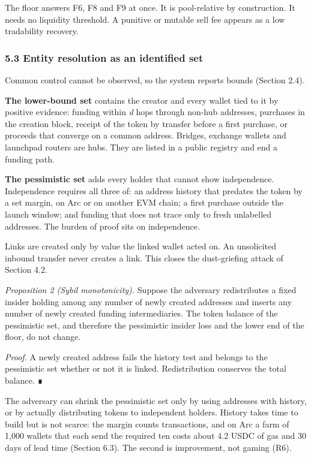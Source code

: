 The floor answers F6, F8 and F9 at once. It is pool-relative by construction. It needs no liquidity threshold. A punitive or mutable sell fee appears as a low tradability recovery.

\subsubsection{5.3 Entity resolution as an identified set}\label{entity-resolution-as-an-identified-set}

Common control cannot be observed, so the system reports bounds (Section 2.4).

\textbf{The lower-bound set} contains the creator and every wallet tied to it by positive evidence: funding within \emph{d} hops through non-hub addresses, purchases in the creation block, receipt of the token by transfer before a first purchase, or proceeds that converge on a common address. Bridges, exchange wallets and launchpad routers are hubs. They are listed in a public registry and end a funding path.

\textbf{The pessimistic set} adds every holder that cannot show independence. Independence requires all three of: an address history that predates the token by a set margin, on Arc or on another EVM chain; a first purchase outside the launch window; and funding that does not trace only to fresh unlabelled addresses. The burden of proof sits on independence.

Links are created only by value the linked wallet acted on. An unsolicited inbound transfer never creates a link. This closes the dust-griefing attack of Section 4.2.

\emph{Proposition 2 (Sybil monotonicity).} Suppose the adversary redistributes a fixed insider holding among any number of newly created addresses and inserts any number of newly created funding intermediaries. The token balance of the pessimistic set, and therefore the pessimistic insider loss and the lower end of the floor, do not change.

\emph{Proof.} A newly created address fails the history test and belongs to the pessimistic set whether or not it is linked. Redistribution conserves the total balance. ∎

The adversary can shrink the pessimistic set only by using addresses with history, or by actually distributing tokens to independent holders. History takes time to build but is not scarce: the margin counts transactions, and on Arc a farm of 1,000 wallets that each send the required ten costs about 4.2 USDC of gas and 30 days of lead time (Section 6.3). The second is improvement, not gaming (R6).

